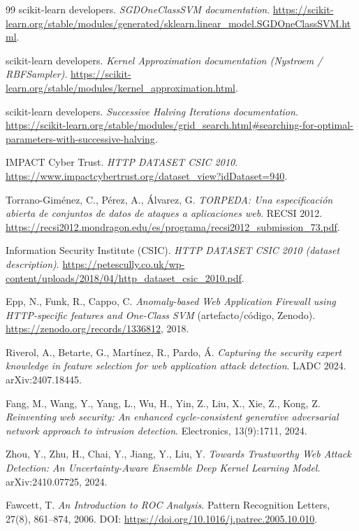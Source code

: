 \documentclass[12pt,oneside]{report}
\begin{document}
\begin{thebibliography}{99}
scikit-learn developers. \emph{SGDOneClassSVM documentation}. \url{https://scikit-learn.org/stable/modules/generated/sklearn.linear_model.SGDOneClassSVM.html}.

scikit-learn developers. \emph{Kernel Approximation documentation (Nystroem / RBFSampler)}. \url{https://scikit-learn.org/stable/modules/kernel_approximation.html}.

scikit-learn developers. \emph{Successive Halving Iterations documentation}. \url{https://scikit-learn.org/stable/modules/grid_search.html#searching-for-optimal-parameters-with-successive-halving}.

IMPACT Cyber Trust. \emph{HTTP DATASET CSIC 2010}. \url{https://www.impactcybertrust.org/dataset_view?idDataset=940}.

Torrano-Gim{\'e}nez, C., P{\'e}rez, A., {\'A}lvarez, G.
\emph{TORPEDA: Una especificación abierta de conjuntos de datos de ataques a aplicaciones web}. RECSI 2012.
\url{https://recsi2012.mondragon.edu/es/programa/recsi2012_submission_73.pdf}.

Information Security Institute (CSIC).
\emph{HTTP DATASET CSIC 2010 (dataset description)}.
\url{https://petescully.co.uk/wp-content/uploads/2018/04/http_dataset_csic_2010.pdf}.

Epp, N., Funk, R., Cappo, C.
\emph{Anomaly-based Web Application Firewall using HTTP-specific features and One-Class SVM} (artefacto/código, Zenodo).
\url{https://zenodo.org/records/1336812}, 2018.

Riverol, A., Betarte, G., Martínez, R., Pardo, Á.
\emph{Capturing the security expert knowledge in feature selection for web application attack detection}.
LADC 2024. arXiv:2407.18445.

Fang, M., Wang, Y., Yang, L., Wu, H., Yin, Z., Liu, X., Xie, Z., Kong, Z.
\emph{Reinventing web security: An enhanced cycle-consistent generative adversarial network approach to intrusion detection}.
Electronics, 13(9):1711, 2024.

Zhou, Y., Zhu, H., Chai, Y., Jiang, Y., Liu, Y.
\emph{Towards Trustworthy Web Attack Detection: An Uncertainty-Aware Ensemble Deep Kernel Learning Model}.
arXiv:2410.07725, 2024.

Fawcett, T.
\emph{An Introduction to ROC Analysis}.
Pattern Recognition Letters, 27(8), 861--874, 2006. DOI: \url{https://doi.org/10.1016/j.patrec.2005.10.010}.


\end{thebibliography}
\end{document}
